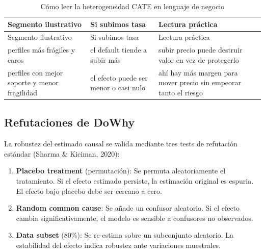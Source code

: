 \documentclass[
  spanish,
  11pt,
  letterpaper,
]{scrbook}
\providecommand{\tightlist}{%
  \setlength{\itemsep}{0pt}\setlength{\parskip}{0pt}}
\theoremstyle{plain}
\theoremstyle{remark}
\begin{document}
\begin{longtable}[]{@{}
  >{\raggedright\arraybackslash}p{}
  >{\raggedright\arraybackslash}p{}
  >{\raggedright\arraybackslash}p{}@{}}
\caption{Cómo leer la heterogeneidad CATE en lenguaje de
negocio}\label{tbl-cate-business-reading}\tabularnewline
\toprule\noalign{}
\begin{minipage}[b]{\linewidth}\raggedright
Segmento ilustrativo
\end{minipage} & \begin{minipage}[b]{\linewidth}\raggedright
Si subimos tasa
\end{minipage} & \begin{minipage}[b]{\linewidth}\raggedright
Lectura práctica
\end{minipage} \\
\midrule\noalign{}
\endfirsthead
\toprule\noalign{}
\begin{minipage}[b]{\linewidth}\raggedright
Segmento ilustrativo
\end{minipage} & \begin{minipage}[b]{\linewidth}\raggedright
Si subimos tasa
\end{minipage} & \begin{minipage}[b]{\linewidth}\raggedright
Lectura práctica
\end{minipage} \\
\midrule\noalign{}
\endhead
\bottomrule\noalign{}
\endlastfoot
perfiles más frágiles y caros & el default tiende a subir más & subir
precio puede destruir valor en vez de protegerlo \\
perfiles con mejor soporte y menor fragilidad & el efecto puede ser
menor o casi nulo & ahí hay más margen para mover precio sin empeorar
tanto el riesgo \\
\end{longtable}

\subsection{Refutaciones de DoWhy}\label{refutaciones-de-dowhy}

La robustez del estimado causal se valida mediante tres tests de
refutación estándar (Sharma \& Kiciman, 2020):

\begin{enumerate}
\def\labelenumi{\arabic{enumi}.}
\tightlist
\item
  \textbf{Placebo treatment} (permutación): Se permuta aleatoriamente el
  tratamiento. Si el efecto estimado persiste, la estimación original es
  espuria. El efecto bajo placebo debe ser cercano a cero.
\item
  \textbf{Random common cause}: Se añade un confusor aleatorio. Si el
  efecto cambia significativamente, el modelo es sensible a confusores
  no observados.
\item
  \textbf{Data subset} (80\%): Se re-estima sobre un subconjunto
  aleatorio. La estabilidad del efecto indica robustez ante variaciones
  muestrales.
\end{enumerate}
\end{document}
